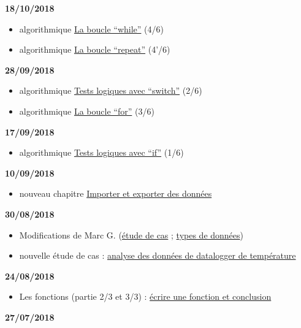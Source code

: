 \documentclass[]{book}
\providecommand{\tightlist}{%
  \setlength{\itemsep}{0pt}\setlength{\parskip}{0pt}}
\theoremstyle{definition}
\theoremstyle{definition}
\theoremstyle{definition}
\theoremstyle{remark}
\begin{document}
\textbf{18/10/2018}

\begin{itemize}
\tightlist
\item
  algorithmique \protect\hyperlink{l17while}{La boucle ``while''} (4/6)
\item
  algorithmique \protect\hyperlink{l17repeat}{La boucle ``repeat''}
  (4'/6)
\end{itemize}

\textbf{28/09/2018}

\begin{itemize}
\tightlist
\item
  algorithmique \protect\hyperlink{l17switch}{Tests logiques avec
  ``switch''} (2/6)
\item
  algorithmique \protect\hyperlink{l17for}{La boucle ``for''} (3/6)
\end{itemize}

\textbf{17/09/2018}

\begin{itemize}
\tightlist
\item
  algorithmique \protect\hyperlink{l17if}{Tests logiques avec ``if''}
  (1/6)
\end{itemize}

\textbf{10/09/2018}

\begin{itemize}
\tightlist
\item
  nouveau chapitre \protect\hyperlink{import}{Importer et exporter des
  données}
\end{itemize}

\textbf{30/08/2018}

\begin{itemize}
\tightlist
\item
  Modifications de Marc G. (\protect\hyperlink{studyCase002}{étude de
  cas} ; \protect\hyperlink{dataType1}{types de données})
\item
  nouvelle étude de cas : \protect\hyperlink{studyCase001}{analyse des
  données de datalogger de température}
\end{itemize}

\textbf{24/08/2018}

\begin{itemize}
\tightlist
\item
  Les fonctions (partie 2/3 et 3/3) :
  \protect\hyperlink{l015function}{écrire une fonction et conclusion}
\end{itemize}

\textbf{27/07/2018}
\end{document}
